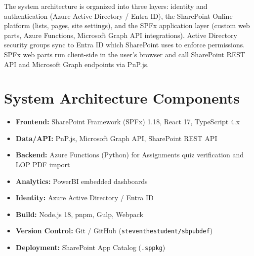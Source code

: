 \documentclass{article}
\begin{document}
The system architecture is organized into three layers: identity and authentication (Azure Active Directory / Entra ID), the SharePoint Online platform (lists, pages, site settings), and the SPFx application layer (custom web parts, Azure Functions, Microsoft Graph API integrations). Active Directory security groups sync to Entra ID which SharePoint uses to enforce permissions. SPFx web parts run client-side in the user’s browser and call SharePoint REST API and Microsoft Graph endpoints via PnP.js.

\section*{System Architecture Components}

\begin{itemize}
    \item \textbf{Frontend:} SharePoint Framework (SPFx) 1.18, React 17, TypeScript 4.x
    \item \textbf{Data/API:} PnP.js, Microsoft Graph API, SharePoint REST API
    \item \textbf{Backend:} Azure Functions (Python) for Assignments quiz verification and LOP PDF import
    \item \textbf{Analytics:} PowerBI embedded dashboards
    \item \textbf{Identity:} Azure Active Directory / Entra ID
    \item \textbf{Build:} Node.js 18, pnpm, Gulp, Webpack
    \item \textbf{Version Control:} Git / GitHub (\texttt{steventhestudent/sbpubdef})
    \item \textbf{Deployment:} SharePoint App Catalog (\texttt{.sppkg})
\end{itemize}
\end{document}
